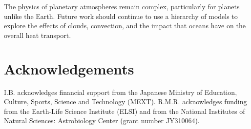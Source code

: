 \documentclass[fleqn,usenatbib]{mnras}
\begin{document}
The physics of planetary atmospheres remain complex, particularly for planets unlike the Earth. Future work should continue to use a hierarchy of models to explore the effects of clouds, convection, and the impact that oceans have on the overall heat transport. 

\section*{Acknowledgements}
I.B. acknowledges financial support from the Japanese Ministry of Education, Culture, Sports, Science and Technology (MEXT).
R.M.R. acknowledges funding from the Earth-Life Science Institute (ELSI) and from the National Institutes of Natural Sciences: Astrobiology Center (grant number JY310064).













\bsp	%
\label{lastpage}
\end{document}
